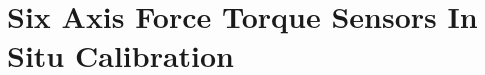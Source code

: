 \chapter{Six Axis Force Torque Sensors In Situ Calibration}
\label{chap:ft-calib}

\graphicspath{{./Chapter50ForceTorqueCalibration/}}






% 